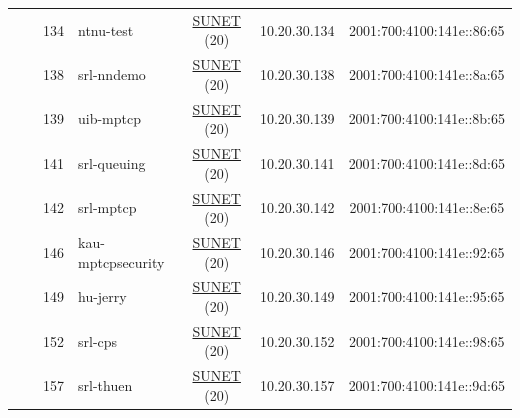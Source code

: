 \begin{small}
\begin{center}
\begin{longtable}{|c|c|c|c|c|c|c|c|}
  &  & \tiny{134} & \multicolumn{1}{|l|}{\tiny{ntnu-test}} & \multicolumn{2}{|c|}{\tiny{\href{http://www.sunet.se}{SUNET} (20)}} & \tiny{10.20.30.134} & \tiny{2001:700:4100:141e::86:65} \\* \cline{3-3}\cline{4-4}\cline{5-5}\cline{6-6}\cline{7-7}\cline{8-8}
  &  & \tiny{138} & \multicolumn{1}{|l|}{\tiny{srl-nndemo}} & \multicolumn{2}{|c|}{\tiny{\href{http://www.sunet.se}{SUNET} (20)}} & \tiny{10.20.30.138} & \tiny{2001:700:4100:141e::8a:65} \\* \cline{3-3}\cline{4-4}\cline{5-5}\cline{6-6}\cline{7-7}\cline{8-8}
  &  & \tiny{139} & \multicolumn{1}{|l|}{\tiny{uib-mptcp}} & \multicolumn{2}{|c|}{\tiny{\href{http://www.sunet.se}{SUNET} (20)}} & \tiny{10.20.30.139} & \tiny{2001:700:4100:141e::8b:65} \\* \cline{3-3}\cline{4-4}\cline{5-5}\cline{6-6}\cline{7-7}\cline{8-8}
  &  & \tiny{141} & \multicolumn{1}{|l|}{\tiny{srl-queuing}} & \multicolumn{2}{|c|}{\tiny{\href{http://www.sunet.se}{SUNET} (20)}} & \tiny{10.20.30.141} & \tiny{2001:700:4100:141e::8d:65} \\* \cline{3-3}\cline{4-4}\cline{5-5}\cline{6-6}\cline{7-7}\cline{8-8}
  &  & \tiny{142} & \multicolumn{1}{|l|}{\tiny{srl-mptcp}} & \multicolumn{2}{|c|}{\tiny{\href{http://www.sunet.se}{SUNET} (20)}} & \tiny{10.20.30.142} & \tiny{2001:700:4100:141e::8e:65} \\* \cline{3-3}\cline{4-4}\cline{5-5}\cline{6-6}\cline{7-7}\cline{8-8}
  &  & \tiny{146} & \multicolumn{1}{|l|}{\tiny{kau-mptcpsecurity}} & \multicolumn{2}{|c|}{\tiny{\href{http://www.sunet.se}{SUNET} (20)}} & \tiny{10.20.30.146} & \tiny{2001:700:4100:141e::92:65} \\* \cline{3-3}\cline{4-4}\cline{5-5}\cline{6-6}\cline{7-7}\cline{8-8}
  &  & \tiny{149} & \multicolumn{1}{|l|}{\tiny{hu-jerry}} & \multicolumn{2}{|c|}{\tiny{\href{http://www.sunet.se}{SUNET} (20)}} & \tiny{10.20.30.149} & \tiny{2001:700:4100:141e::95:65} \\* \cline{3-3}\cline{4-4}\cline{5-5}\cline{6-6}\cline{7-7}\cline{8-8}
  &  & \tiny{152} & \multicolumn{1}{|l|}{\tiny{srl-cps}} & \multicolumn{2}{|c|}{\tiny{\href{http://www.sunet.se}{SUNET} (20)}} & \tiny{10.20.30.152} & \tiny{2001:700:4100:141e::98:65} \\* \cline{3-3}\cline{4-4}\cline{5-5}\cline{6-6}\cline{7-7}\cline{8-8}
  &  & \tiny{157} & \multicolumn{1}{|l|}{\tiny{srl-thuen}} & \multicolumn{2}{|c|}{\tiny{\href{http://www.sunet.se}{SUNET} (20)}} & \tiny{10.20.30.157} & \tiny{2001:700:4100:141e::9d:65} \\* \cline{3-3}\cline{4-4}\cline{5-5}\cline{6-6}\cline{7-7}\cline{8-8}

\end{longtable}
\end{center}
\end{small}
